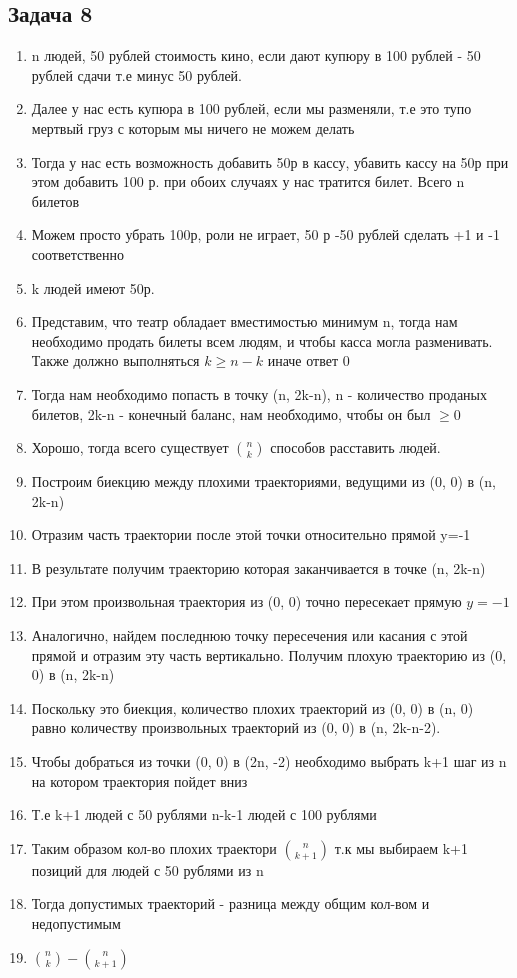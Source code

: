\documentclass[a4paper,12pt]{article}
\begin{document}
\subsection{Задача 8}
\begin{enumerate}
    \item n людей, 50 рублей стоимость кино, если дают купюру в 100 рублей - 50 рублей сдачи т.е минус 50 рублей.
    \item Далее у нас есть купюра в 100 рублей, если мы разменяли, т.е это тупо мертвый груз с которым мы ничего не можем делать
    \item Тогда у нас есть возможность добавить 50р в кассу, убавить кассу на 50р при этом добавить 100 р. при обоих случаях у нас тратится билет. Всего n билетов
    \item Можем просто убрать 100р, роли не играет, 50 р -50 рублей сделать +1 и -1 соответственно
    \item k людей имеют 50р. 
    \item Представим, что театр обладает вместимостью минимум n, тогда нам необходимо продать билеты всем людям, и чтобы касса могла разменивать. Также должно выполняться $k\ge n-k$ иначе ответ 0
    \item Тогда нам необходимо попасть в точку (n, 2k-n), n - количество проданых билетов, 2k-n - конечный баланс, нам необходимо, чтобы он был $\ge 0$
    \item Хорошо, тогда всего существует $\binom{n}{k}$ способов расставить людей.
    \item Построим биекцию между плохими траекториями, ведущими из (0, 0) в (n, 2k-n)
    \item Отразим часть траектории после этой точки относительно прямой y=-1
    \item В результате получим траекторию которая заканчивается в точке (n, 2k-n)
    \item При этом произвольная траектория из (0, 0) точно пересекает прямую $y=-1$
    \item Аналогично, найдем последнюю точку пересечения или касания с этой прямой и отразим эту часть вертикально. Получим плохую траекторию из (0, 0) в (n, 2k-n)
    \item Поскольку это биекция, количество плохих траекторий из (0, 0) в (n, 0) равно количеству произвольных траекторий из (0, 0) в (n, 2k-n-2).
    \item Чтобы добраться из точки (0, 0) в (2n, -2) необходимо выбрать k+1 шаг из n на котором траектория пойдет вниз
    \item Т.е k+1 людей с 50 рублями n-k-1 людей с 100 рублями
    \item Таким образом кол-во плохих траектори $\binom{n}{k+1}$ т.к мы выбираем k+1 позиций для людей с 50 рублями из n
    \item Тогда допустимых траекторий - разница между общим кол-вом и недопустимым 
    \item $\binom{n}{k}-\binom{n}{k+1}$
\end{enumerate}
\end{document}
